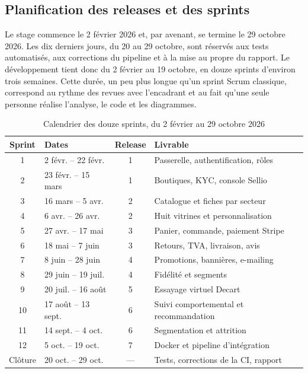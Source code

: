 \subsection{Planification des releases et des sprints}
Le stage commence le 2 février 2026 et, par avenant, se termine le 29 octobre 2026. Les dix derniers jours, du 20 au 29 octobre, sont réservés aux tests automatisés, aux corrections du pipeline et à la mise au propre du rapport. Le développement tient donc du 2 février au 19 octobre, en douze sprints d'environ trois semaines. Cette durée, un peu plus longue qu'un sprint Scrum classique, correspond au rythme des revues avec l'encadrant et au fait qu'une seule personne réalise l'analyse, le code et les diagrammes.

\begin{table}[H]
\centering
\renewcommand{\arraystretch}{1.25}
\small
\begin{tabular}{|c|p{3.4cm}|c|p{7.2cm}|}
\hline
\textbf{Sprint} & \textbf{Dates} & \textbf{Release} & \textbf{Livrable} \\
\hline
1 & 2 févr. -- 22 févr. & 1 & Passerelle, authentification, rôles \\
\hline
2 & 23 févr. -- 15 mars & 1 & Boutiques, KYC, console Sellio \\
\hline
3 & 16 mars -- 5 avr. & 2 & Catalogue et fiches par secteur \\
\hline
4 & 6 avr. -- 26 avr. & 2 & Huit vitrines et personnalisation \\
\hline
5 & 27 avr. -- 17 mai & 3 & Panier, commande, paiement Stripe \\
\hline
6 & 18 mai -- 7 juin & 3 & Retours, TVA, livraison, avis \\
\hline
7 & 8 juin -- 28 juin & 4 & Promotions, bannières, e-mailing \\
\hline
8 & 29 juin -- 19 juil. & 4 & Fidélité et segments \\
\hline
9 & 20 juil. -- 16 août & 5 & Essayage virtuel Decart \\
\hline
10 & 17 août -- 13 sept. & 6 & Suivi comportemental et recommandation \\
\hline
11 & 14 sept. -- 4 oct. & 6 & Segmentation et attrition \\
\hline
12 & 5 oct. -- 19 oct. & 7 & Docker et pipeline d'intégration \\
\hline
Clôture & 20 oct. -- 29 oct. & --- & Tests, corrections de la CI, rapport \\
\hline
\end{tabular}
\caption{Calendrier des douze sprints, du 2 février au 29 octobre 2026}
\label{tab:calendrier-sprints}
\end{table}

